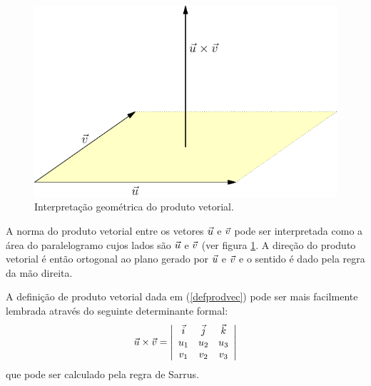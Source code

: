 \begin{figure}%
\begin{center}
     \includegraphics[width=\textwidth]{./cap_algvet/pics/prod_vec_paralelogramo}
      \caption{Interpretação geométrica do produto vetorial.}\label{fig:prod_paralelo}
      \end{center}
  \end{figure}

  A norma do produto vetorial entre os vetores $\vec{u}$ e $\vec{v}$ pode ser interpretada como a área do paralelogramo cujos lados são $\vec{u}$ e $\vec{v}$ (ver figura \ref{fig:prod_paralelo}. A direção do produto vetorial é então ortogonal ao plano gerado por  $\vec{u}$ e $\vec{v}$  e o sentido é dado pela regra da mão direita.




A definição de produto vetorial dada em (\ref{defprodvec}) pode ser mais facilmente lembrada através do seguinte determinante formal:
\begin{equation}\label{detprodvec}
\vec{u}\times\vec{v}=\left|\begin{array}{ccc}
\vec{i}&\vec{j}&\vec{k}\\
u_1 & u_2 & u_3\\
v_1 & v_2 & v_3\\
\end{array}
\right|
\end{equation}
que pode ser calculado pela regra de Sarrus.

